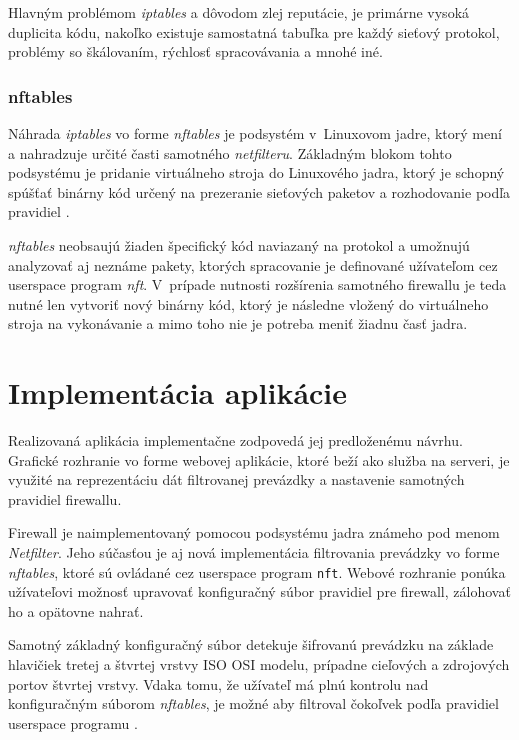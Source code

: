 Hlavným problémom \emph{iptables} a dôvodom zlej reputácie, je primárne vysoká duplicita kódu, nakoľko existuje samostatná tabuľka pre každý sieťový protokol, problémy so škálovaním, rýchlosť spracovávania a mnohé iné.

\subsection{nftables}
\label{nftables}
Náhrada \emph{iptables} vo forme \emph{nftables} je podsystém v~Linuxovom jadre, ktorý mení a nahradzuje určité časti samotného \emph{netfilteru}. Základným blokom tohto podsystému je pridanie virtuálneho stroja do Linuxového jadra, ktorý je schopný spúšťať binárny kód určený na prezeranie sieťových paketov a rozhodovanie podľa pravidiel \cite{manpages, netfilter}. 

                                                                                 
\emph{nftables} neobsaujú žiaden špecifický kód naviazaný na protokol a umožnujú analyzovať aj neznáme pakety, ktorých spracovanie je definované užívateľom cez userspace program \emph{nft}. V~prípade nutnosti rozšírenia samotného firewallu je teda nutné len vytvoriť nový binárny kód, ktorý je následne vložený do virtuálneho stroja na vykonávanie a mimo toho nie je potreba meniť žiadnu časť jadra.



\chapter{Implementácia aplikácie}
Realizovaná aplikácia implementačne zodpovedá jej predloženému návrhu. Grafické rozhranie vo forme webovej aplikácie, ktoré beží ako služba na serveri, je využité na reprezentáciu dát filtrovanej prevázdky a nastavenie samotných pravidiel firewallu.

Firewall je naimplementovaný pomocou podsystému jadra známeho pod menom \emph{Netfilter}. Jeho súčasťou je aj nová implementácia filtrovania prevádzky vo forme \emph{nftables}, ktoré sú ovládané cez userspace program \texttt{nft}. Webové rozhranie ponúka užívateľovi možnosť upravovať konfiguračný súbor pravidiel pre firewall, zálohovať ho a opätovne nahrať. 

Samotný základný konfiguračný súbor detekuje šifrovanú prevádzku na základe hlavičiek tretej a štvrtej vrstvy ISO OSI modelu, prípadne cieľových a zdrojových portov štvrtej vrstvy. Vdaka tomu, že užívateľ má plnú kontrolu nad konfiguračným súborom \emph{nftables}, je možné aby filtroval čokoľvek podľa pravidiel userspace programu \cite{nftables}.

